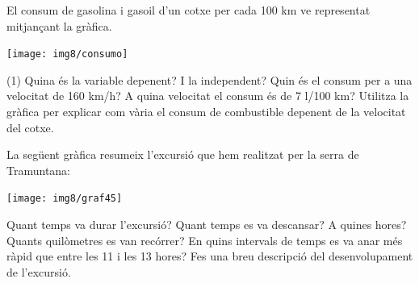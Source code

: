 \begin{mylist}
	\exer  
	El consum de gasolina i gasoil d'un cotxe per cada 100 km ve representat mitjançant la gràfica.
	
	\begin{minipage}{0.4\textwidth}
		\centering
		\texttt{[image: img8/consumo]}
	\end{minipage}
	\begin{minipage}{0.55\textwidth}
	\begin{tasks}(1)
		\task  Quina és la variable depenent? 
		\task  I la independent?
		\task  Quin és el consum per a una velocitat de 160 km/h?
		\task  A quina velocitat el consum és de 7 l/100 km?
		\task  Utilitza la gràfica per explicar com vària el consum de combustible depenent de la velocitat del cotxe.
	\end{tasks}
	\end{minipage}

  
 \exer La següent gràfica resumeix l'excursió que hem realitzat per la serra de Tramuntana:
		
	\begin{minipage}{0.4\textwidth}
		\centering
		\texttt{[image: img8/graf45]}
	\end{minipage}
	\begin{minipage}{0.53\textwidth}
	\begin{tasks}
		\task Quant temps va durar l'excursió?
		\task  Quant temps es va descansar? A quines hores?
		\task  Quants quilòmetres es van recórrer?
		\task  En quins intervals de temps es va anar més ràpid que entre les 11 i les 13 hores?
		\task  Fes una breu descripció del desenvolupament de l'excursió.
	\end{tasks}
	
\end{minipage}



\end{mylist}
